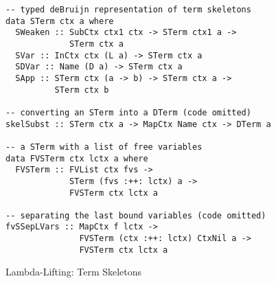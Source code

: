 \documentclass[natbib]{sigplanconf}
\begin{document}
\begin{figure}[t]
\begin{lstlisting}[basicstyle=\ttfamily\scriptsize]
-- typed deBruijn representation of term skeletons
data STerm ctx a where
  SWeaken :: SubCtx ctx1 ctx -> STerm ctx1 a ->
             STerm ctx a
  SVar :: InCtx ctx (L a) -> STerm ctx a
  SDVar :: Name (D a) -> STerm ctx a
  SApp :: STerm ctx (a -> b) -> STerm ctx a ->
          STerm ctx b

-- converting an STerm into a DTerm (code omitted)
skelSubst :: STerm ctx a -> MapCtx Name ctx -> DTerm a

-- a STerm with a list of free variables
data FVSTerm ctx lctx a where
  FVSTerm :: FVList ctx fvs ->
             STerm (fvs :++: lctx) a ->
             FVSTerm ctx lctx a

-- separating the last bound variables (code omitted)
fvSSepLVars :: MapCtx f lctx ->
               FVSTerm (ctx :++: lctx) CtxNil a ->
               FVSTerm ctx lctx a
\end{lstlisting}
\caption{Lambda-Lifting: Term Skeletons}
\label{fig:term-skeletons}
\end{figure}





\end{document}
